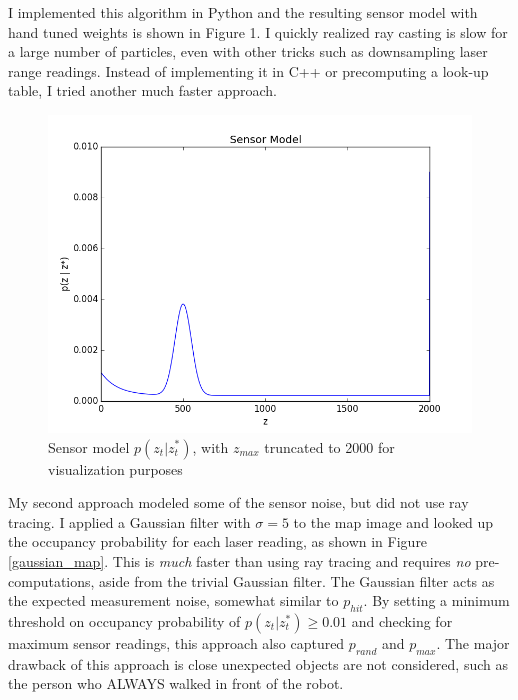 \documentclass[11pt]{amsart}
\begin{document}
I implemented this algorithm in Python and the resulting sensor model with hand tuned weights is shown in Figure 1. I quickly realized ray casting is slow for a large number of particles, even with other tricks such as downsampling laser range readings. Instead of implementing it in C++ or precomputing a look-up table, I tried another much faster approach.
\begin{figure}[t]
\centering
	\label{sensor_model}
        \includegraphics[totalheight=8cm]{sensor_model.png}
        \caption{Sensor model $p(z_t | z_t^*)$, with $z_{max}$ truncated to 2000 for visualization purposes}
\end{figure}

My second approach modeled some of the sensor noise, but did not use ray tracing. I applied a Gaussian filter with $\sigma = 5$ to the map image and looked up the occupancy probability for each laser reading, as shown in Figure \ref{gaussian_map}. This is \emph{much} faster than using ray tracing and requires \emph{no} pre-computations, aside from the trivial Gaussian filter. The Gaussian filter acts as the expected measurement noise, somewhat similar to $p_{hit}$. By setting a minimum threshold on occupancy probability of $p(z_t | z_t^*) \geq 0.01$ and checking for maximum sensor readings, this approach also captured $p_{rand}$ and $p_{max}$. The major drawback of this approach is close unexpected objects are not considered, such as the person who ALWAYS walked in front of the robot.
\end{document}
